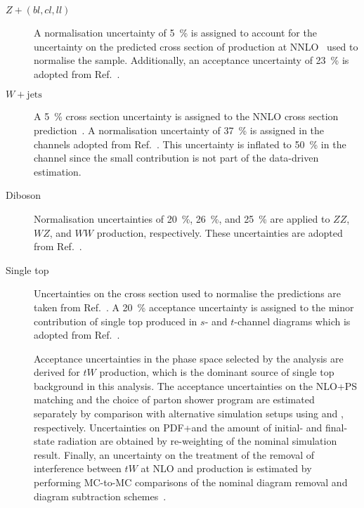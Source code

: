 \begin{description}

\item[$Z + (bl, cl, ll)$] A normalisation uncertainty of \SI{5}{\percent} is
  assigned to account for the uncertainty on the predicted cross section of
  \Zjets production at NNLO~\cite{Anastasiou:2003ds} used to normalise the
  sample. Additionally, an acceptance uncertainty of \SI{23}{\percent} is
  adopted from Ref.~\cite{HIGG-2018-51}.

\item[$W + \text{jets}$] A \SI{5}{\percent} cross section uncertainty is
  assigned to the NNLO cross section prediction~\cite{Anastasiou:2003ds}. A
  normalisation uncertainty of \SI{37}{\percent} is assigned in the \lephad
  channels adopted from Ref.~\cite{HIGG-2018-51}. This uncertainty is inflated
  to \SI{50}{\percent} in the \hadhad channel since the small \Wjets
  contribution is not part of the data-driven \faketauhadvis estimation.

\item[Diboson] Normalisation uncertainties of \SI{20}{\percent},
  \SI{26}{\percent}, and \SI{25}{\percent} are applied to $ZZ$, $WZ$, and $WW$
  production, respectively. These uncertainties are adopted from
  Ref.~\cite{HIGG-2018-51}.

\item[Single top] Uncertainties on the cross section used to normalise the
  predictions are taken from Ref.~\cite{stopxsec}. A \SI{20}{\percent}
  acceptance uncertainty is assigned to the minor contribution of single top
  produced in $s$- and $t$-channel diagrams which is adopted from
  Ref.~\cite{HIGG-2018-51}.

  Acceptance uncertainties in the phase space selected by the analysis are
  derived for $tW$ production, which is the dominant source of single top
  background in this analysis. The acceptance uncertainties on the NLO+PS
  matching and the choice of parton shower program are estimated separately by
  comparison with alternative simulation setups using \MGNLO[2.6.2] and
  \HERWIG[7], respectively. Uncertainties on PDF+\alphas and the amount of
  initial- and final-state radiation are obtained by re-weighting of the nominal
  simulation result. Finally, an uncertainty on the treatment of the removal of
  interference between $tW$ at NLO and \ttbar production is estimated by
  performing MC-to-MC comparisons of the nominal diagram removal and diagram
  subtraction schemes~\cite{Frixione:2008yi}.


\end{description}
